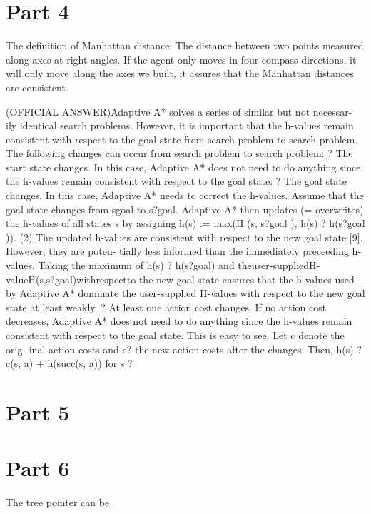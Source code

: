 \documentclass[12pt]{amsart}
\begin{document}
\section{Part 4}
The definition of Manhattan distance: The distance between two points measured along axes at right angles. If the agent only moves in four compass directions, it will only move along the axes we built, it assures that the Manhattan distances are consistent.

(OFFICIAL ANSWER)Adaptive A* solves a series of similar but not necessar- ily identical search problems. However, it is important that the h-values remain consistent with respect to the goal state from search problem to search problem. The following changes can occur from search problem to search problem:
? The start state changes. In this case, Adaptive A* does not need to do anything since the h-values remain consistent with respect to the goal state.
? The goal state changes. In this case, Adaptive A* needs to correct the h-values. Assume that the goal state changes from sgoal to s?goal. Adaptive A* then updates (= overwrites) the h-values of all states s by assigning
h(s) := max(H (s, s?goal ), h(s) ? h(s?goal )). (2)
The updated h-values are consistent with respect to the new goal state [9]. However, they are poten- tially less informed than the immediately preceeding h-values. Taking the maximum of h(s) ? h(s?goal) and theuser-suppliedH-valueH(s,s?goal)withrespectto the new goal state ensures that the h-values used by Adaptive A* dominate the user-supplied H-values with respect to the new goal state at least weakly.
? At least one action cost changes. If no action cost decreases, Adaptive A* does not need to do anything since the h-values remain consistent with respect to the goal state. This is easy to see. Let c denote the orig- inal action costs and c? the new action costs after the changes. Then, h(s) ? c(s, a) + h(succ(s, a)) for s ?
\section{Part 5}
\section{Part 6}
The tree pointer can be 
\end{document}
